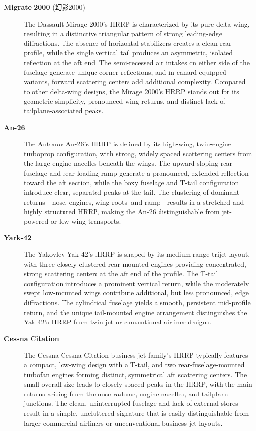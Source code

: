 {\begin{description}
    \item[\textbf{Migrate 2000} (幻影2000)]
    The Dassault Mirage 2000's HRRP is characterized by its pure delta wing, resulting in a distinctive triangular pattern of strong leading-edge diffractions. The absence of horizontal stabilizers creates a clean rear profile, while the single vertical tail produces an asymmetric, isolated reflection at the aft end. The semi-recessed air intakes on either side of the fuselage generate unique corner reflections, and in canard-equipped variants, forward scattering centers add additional complexity. Compared to other delta-wing designs, the Mirage 2000's HRRP stands out for its geometric simplicity, pronounced wing returns, and distinct lack of tailplane-associated peaks.

    \item[\textbf{An-26}]
    The Antonov An-26's HRRP is defined by its high-wing, twin-engine turboprop configuration, with strong, widely spaced scattering centers from the large engine nacelles beneath the wings. The upward-sloping rear fuselage and rear loading ramp generate a pronounced, extended reflection toward the aft section, while the boxy fuselage and T-tail configuration introduce clear, separated peaks at the tail. The clustering of dominant returns—nose, engines, wing roots, and ramp—results in a stretched and highly structured HRRP, making the An-26 distinguishable from jet-powered or low-wing transports.

    \item[\textbf{Yark-42}]
    The Yakovlev Yak-42's HRRP is shaped by its medium-range trijet layout, with three closely clustered rear-mounted engines providing concentrated, strong scattering centers at the aft end of the profile. The T-tail configuration introduces a prominent vertical return, while the moderately swept low-mounted wings contribute additional, but less pronounced, edge diffractions. The cylindrical fuselage yields a smooth, persistent mid-profile return, and the unique tail-mounted engine arrangement distinguishes the Yak-42's HRRP from twin-jet or conventional airliner designs.

    \item[\textbf{Cessna Citation}]
    The Cessna Cessna Citation business jet family's HRRP typically features a compact, low-wing design with a T-tail, and two rear-fuselage-mounted turbofan engines forming distinct, symmetrical aft scattering centers. The small overall size leads to closely spaced peaks in the HRRP, with the main returns arising from the nose radome, engine nacelles, and tailplane junctions. The clean, uninterrupted fuselage and lack of external stores result in a simple, uncluttered signature that is easily distinguishable from larger commercial airliners or unconventional business jet layouts.

\end{description}}

